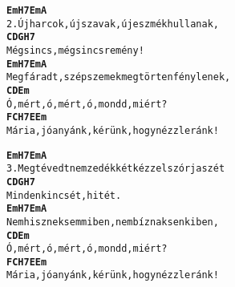 \newpage
{}
\kottastart
{}
\kottaend
\begin{minipage}{\textwidth}
\begin{alltt}
\textbf{   Em         H7         Em         A}
2. Új harcok, új szavak, új eszmék hullanak,
\textbf{    C         D          G   H7}
   Mégsincs, mégsincs remény!
\textbf{    Em          H7         Em        A}
   Megfáradt, szép szemek megtörten fénylenek,
\textbf{   C        D            Em}
   Ó, mért, ó, mért, ó, mondd, miért?
\textbf{           F          C            H7      E   Em}
   Mária, jó anyánk, kérünk, hogy nézz le ránk!
\end{alltt}
\vspace{0.0cm}
\versszakspacing
\end{minipage}
\begin{minipage}{\textwidth}
\begin{alltt}
\textbf{   Em         H7         Em         A}
3. Megtévedt nemzedék két kézzel szórja szét
\textbf{   C       D          G   H7}
   Minden kincsét, hitét.
\textbf{    Em          H7        Em         A}
   Nem hisznek semmiben, nem bíznak senkiben,
\textbf{   C        D            Em}
   Ó, mért, ó, mért, ó, mondd, miért?
\textbf{           F          C            H7      E   Em}
   Mária, jó anyánk, kérünk, hogy nézz le ránk!
\end{alltt}
\vspace{0.0cm}
\versszakspacing
\end{minipage}
